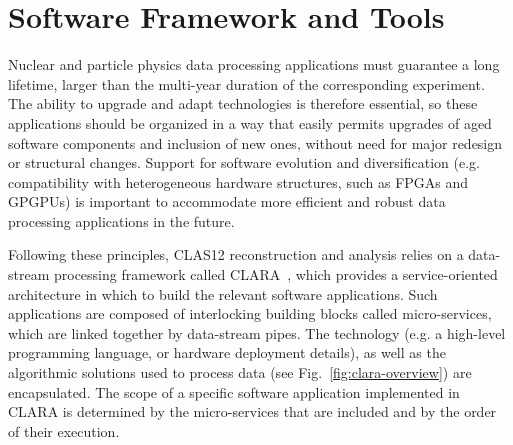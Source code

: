 \section{Software Framework and Tools}
\label{sec:framework}


Nuclear and particle physics data processing applications must guarantee a long lifetime, larger than the multi-year
duration of the corresponding experiment. The ability to upgrade and adapt technologies is therefore essential, so
these applications should be organized in a way that easily permits upgrades of aged software components and
inclusion of new ones, without need for major redesign or structural changes.  Support for software evolution and
diversification (e.g. compatibility with heterogeneous hardware structures, such as FPGAs and GPGPUs) is important
to accommodate more efficient and robust data processing applications in the future.

Following these principles, CLAS12 reconstruction and analysis relies on a data-stream processing framework called
CLARA~\cite{clara-2011,clara-service,framework,clara-2016}, which provides a service-oriented architecture in which
to build the relevant software applications.  Such applications are composed of interlocking building blocks called
micro-services, which are linked together by data-stream pipes.  The technology (e.g. a high-level programming
language, or hardware deployment details), as well as the algorithmic solutions used to process data (see
Fig.~\ref{fig:clara-overview}) are encapsulated. The scope of a specific software application implemented in CLARA
is determined by the micro-services that are included and by the order of their execution.


